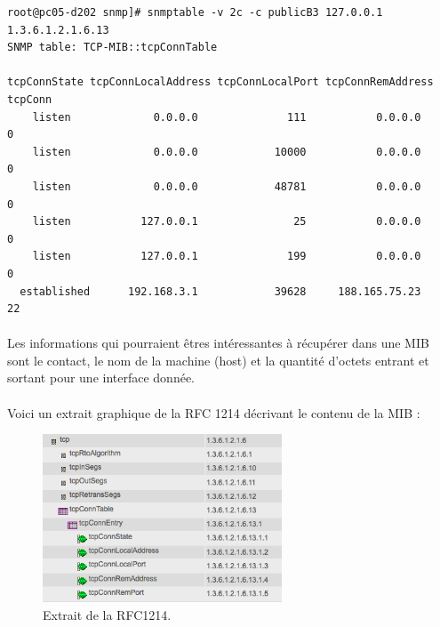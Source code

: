 \documentclass[12pt,a4paper,notitlepage]{article}
\begin{document}
\begin{lstlisting}[title=Résultat snmptable pour les connexions TCP]
root@pc05-d202 snmp]# snmptable -v 2c -c publicB3 127.0.0.1 1.3.6.1.2.1.6.13
SNMP table: TCP-MIB::tcpConnTable

tcpConnState tcpConnLocalAddress tcpConnLocalPort tcpConnRemAddress tcpConn
    listen             0.0.0.0              111           0.0.0.0        0
    listen             0.0.0.0            10000           0.0.0.0        0
    listen             0.0.0.0            48781           0.0.0.0        0
    listen           127.0.0.1               25           0.0.0.0        0
    listen           127.0.0.1              199           0.0.0.0        0
  established      192.168.3.1            39628     188.165.75.23       22
\end{lstlisting}
\paragraph{}Les informations qui pourraient êtres intéressantes à récupérer dans une MIB sont le contact, le nom de la machine (host) et la quantité d'octets entrant et sortant pour une interface donnée. 

\begin{center}
\end{center}

\paragraph{}Voici un extrait graphique de la RFC 1214 décrivant le contenu de la MIB :
\vspace{0.2cm}
\begin{figure}[!h]
\begin{center}
\includegraphics[height=5cm]{rfc1214.png}
\caption{Extrait de la RFC1214.}
\label{fig:rfc1214}
\end{center}
\end{figure}
\end{document}
